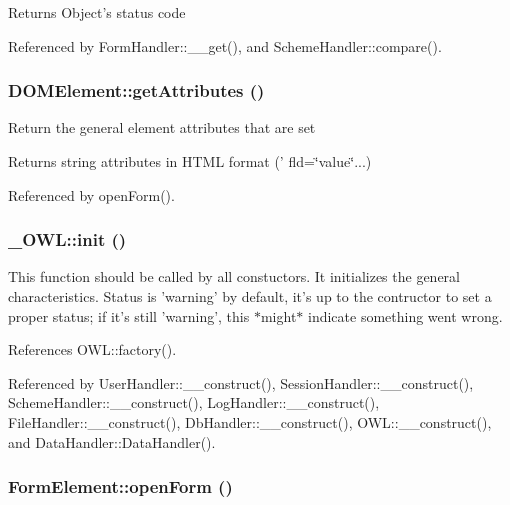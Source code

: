 \begin{DoxyReturn}{Returns}
Object's status code 
\end{DoxyReturn}


Referenced by FormHandler::\_\-\_\-get(), and SchemeHandler::compare().

\subsubsection[{getAttributes}]{\setlength{\rightskip}{0pt plus 5cm}DOMElement::getAttributes ()}\label{classDOMElement_a6c303bd7b18fdf485d05554b2f2191d9}
Return the general element attributes that are set \begin{DoxyReturn}{Returns}
string attributes in HTML format (' fld=\char`\"{}value\char`\"{}...) 
\end{DoxyReturn}


Referenced by openForm().

\subsubsection[{init}]{\setlength{\rightskip}{0pt plus 5cm}\_\-OWL::init ()}\label{class__OWL_ae0ef3ded56e8a6b34b6461e5a721cd3e}
This function should be called by all constuctors. It initializes the general characteristics. Status is 'warning' by default, it's up to the contructor to set a proper status; if it's still 'warning', this $\ast$might$\ast$ indicate something went wrong. 

References OWL::factory().



Referenced by UserHandler::\_\-\_\-construct(), SessionHandler::\_\-\_\-construct(), SchemeHandler::\_\-\_\-construct(), LogHandler::\_\-\_\-construct(), FileHandler::\_\-\_\-construct(), DbHandler::\_\-\_\-construct(), OWL::\_\-\_\-construct(), and DataHandler::DataHandler().

\subsubsection[{openForm}]{\setlength{\rightskip}{0pt plus 5cm}FormElement::openForm ()}\label{classFormElement_a75fc391aab857b0357576d9fe353ab27}


